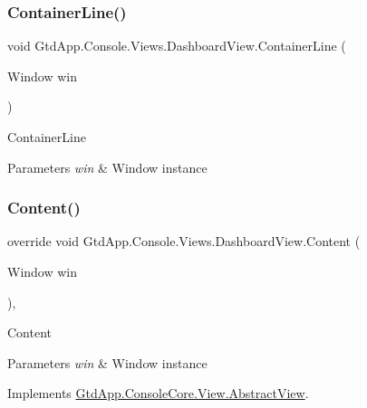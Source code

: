 \subsubsection{\texorpdfstring{Container\+Line()}{ContainerLine()}}
{\footnotesize\ttfamily void Gtd\+App.\+Console.\+Views.\+Dashboard\+View.\+Container\+Line (\begin{DoxyParamCaption}\item[{Window}]{win }\end{DoxyParamCaption})\hspace{0.3cm}{\ttfamily [protected]}}



Container\+Line 


\begin{DoxyParams}{Parameters}
{\em win} & Window instance\\
\hline
\end{DoxyParams}
\mbox{\label{class_gtd_app_1_1_console_1_1_views_1_1_dashboard_view_a29942731cb49497c4f86fc47e3aa3a7e}} 
\subsubsection{\texorpdfstring{Content()}{Content()}}
{\footnotesize\ttfamily override void Gtd\+App.\+Console.\+Views.\+Dashboard\+View.\+Content (\begin{DoxyParamCaption}\item[{Window}]{win }\end{DoxyParamCaption})\hspace{0.3cm}{\ttfamily [protected]}, {\ttfamily [virtual]}}



Content 


\begin{DoxyParams}{Parameters}
{\em win} & Window instance\\
\hline
\end{DoxyParams}


Implements \mbox{\hyperlink{class_gtd_app_1_1_console_core_1_1_view_1_1_abstract_view_a8c518373e635d19875713f2b9f2e1592}{Gtd\+App.\+Console\+Core.\+View.\+Abstract\+View}}.

